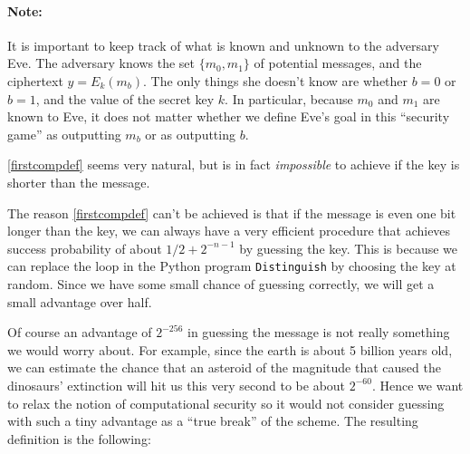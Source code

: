 \paragraph{Note:} It is important to keep track of what is known and
unknown to the adversary Eve. The adversary knows the set
\(\{ m_0,m_1 \}\) of potential messages, and the ciphertext
\(y=E_k(m_b)\). The only things she doesn't know are whether \(b=0\) or
\(b=1\), and the value of the secret key \(k\). In particular, because
\(m_0\) and \(m_1\) are known to Eve, it does not matter whether we
define Eve's goal in this ``security game'' as outputting \(m_b\) or as
outputting \(b\).

\cref{firstcompdef} seems very natural, but is in fact \emph{impossible}
to achieve if the key is shorter than the message.


The reason \cref{firstcompdef} can't be achieved is that if the message
is even one bit longer than the key, we can always have a very efficient
procedure that achieves success probability of about \(1/2 + 2^{-n-1}\)
by guessing the key. This is because we can replace the loop in the
Python program \texttt{Distinguish} by choosing the key at random. Since
we have some small chance of guessing correctly, we will get a small
advantage over half.

Of course an advantage of \(2^{-256}\) in guessing the message is not
really something we would worry about. For example, since the earth is
about 5 billion years old, we can estimate the chance that an asteroid
of the magnitude that caused the dinosaurs' extinction will hit us this
very second to be about \(2^{-60}\). Hence we want to relax the notion
of computational security so it would not consider guessing with such a
tiny advantage as a ``true break'' of the scheme. The resulting
definition is the following:

